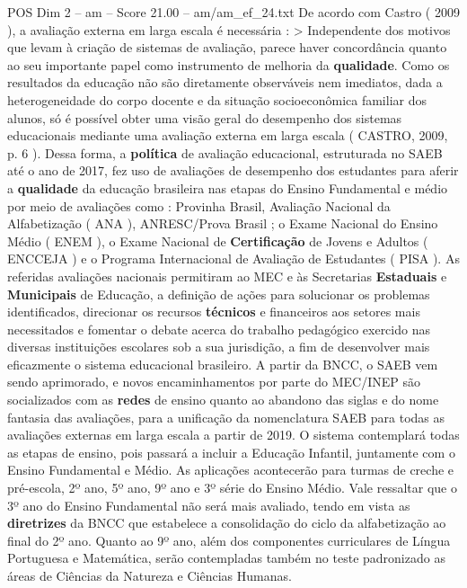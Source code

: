 \begin{textsample}{POS Dim 2 – am – Score 21.00 – am/am\_ef\_24.txt}
De acordo com Castro ( 2009 ), a avaliação externa em larga escala é necessária : > Independente dos motivos que levam à criação de sistemas de avaliação, parece haver concordância quanto ao seu importante papel como instrumento de melhoria da \textbf{qualidade}.
Como os resultados da educação não são diretamente observáveis nem imediatos, dada a heterogeneidade do corpo docente e da situação socioeconômica familiar dos alunos, só é possível obter uma visão geral do desempenho dos sistemas educacionais mediante uma avaliação externa em larga escala ( CASTRO, 2009, p. 6 ).
Dessa forma, a \textbf{política} de avaliação educacional, estruturada no SAEB até o ano de 2017, fez uso de avaliações de desempenho dos estudantes para aferir a \textbf{qualidade} da educação brasileira nas etapas do Ensino Fundamental e médio por meio de avaliações como : Provinha Brasil, Avaliação Nacional da Alfabetização ( ANA ), ANRESC/Prova Brasil ; o Exame Nacional do Ensino Médio ( ENEM ), o Exame Nacional de \textbf{Certificação} de Jovens e Adultos ( ENCCEJA ) e o Programa Internacional de Avaliação de Estudantes ( PISA ).
As referidas avaliações nacionais permitiram ao MEC e às Secretarias \textbf{Estaduais} e \textbf{Municipais} de Educação, a definição de ações para solucionar os problemas identificados, direcionar os recursos \textbf{técnicos} e financeiros aos setores mais necessitados e fomentar o debate acerca do trabalho pedagógico exercido nas diversas instituições escolares sob a sua jurisdição, a fim de desenvolver mais eficazmente o sistema educacional brasileiro.
A partir da BNCC, o SAEB vem sendo aprimorado, e novos encaminhamentos por parte do MEC/INEP são socializados com as \textbf{redes} de ensino quanto ao abandono das siglas e do nome fantasia das avaliações, para a unificação da nomenclatura SAEB para todas as avaliações externas em larga escala a partir de 2019.
O sistema contemplará todas as etapas de ensino, pois passará a incluir a Educação Infantil, juntamente com o Ensino Fundamental e Médio.
As aplicações acontecerão para turmas de creche e pré-escola, 2º ano, 5º ano, 9º ano e 3º série do Ensino Médio.
Vale ressaltar que o 3º ano do Ensino Fundamental não será mais avaliado, tendo em vista as \textbf{diretrizes} da BNCC que estabelece a consolidação do ciclo da alfabetização ao final do 2º ano.
Quanto ao 9º ano, além dos componentes curriculares de Língua Portuguesa e Matemática, serão contempladas também no teste padronizado as áreas de Ciências da Natureza e Ciências Humanas.

\end{textsample}
